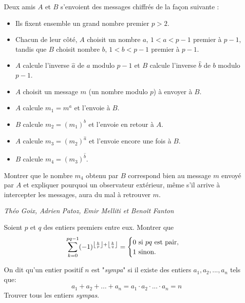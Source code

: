 \begin{exo}{}
Deux amis $A$ et $B$ s'envoient des messages chiffr\'es de la fa\c con suivante :
{\small
\begin{itemize}
\item Ils fixent ensemble un grand nombre premier $p>2$.
\item Chacun de leur c\^ot\'e, $A$ choisit un nombre $a$, $1 < a < p-1$ premier \`a $p-1$, tandis que $B$ choisit nombre $b$, $1<b<p-1$ premier \`a $p-1$.
\item $A$ calcule l'inverse $\widehat{a}$ de $a$ modulo $p-1$ et $B$ calcule l'inverse $\widehat{b}$ de $b$ modulo $p-1$.
\item $A$ choisit un message $m$ (un nombre modulo $p$) \`a envoyer \`a $B$.
\item $A$ calcule $m_1=m^{a}$ et l'envoie \`a $B$.
\item $B$ calcule $m_2=(m_1)^{b}$ et l'envoie en retour \`a $A$.
\item $A$ calcule $m_3=(m_2)^{\widehat{a}}$ et l'envoie encore une fois \`a $B$.
\item $B$ calcule $m_4=(m_3)^{\widehat{b}}$.
\end{itemize}}
Montrer que le nombre $m_4$ obtenu par $B$ correspond bien au message $m$ envoy\'e par $A$ et expliquer pourquoi un observateur ext\'erieur, m\^eme s'il arrive \`a intercepter les messages, aura du mal \`a retrouver $m$.

\medskip
\textit{Théo Goix, Adrien Patoz, Emir Melliti et Benoît Fanton }
\end{exo}


\begin{exo}{}
Soient $p$ et $q$ des entiers premiers entre eux. Montrer que
\[\displaystyle{ \sum_{k=0}^{pq-1} (-1)^{\left\lfloor \frac{k}{p}\right\rfloor + \left\lfloor \frac{k}{q}\right\rfloor} = \begin{cases} 0 \textnormal{ si } pq \textnormal{ est pair,}\\ 1 \textnormal{ sinon.}\end{cases}}\]
\end{exo}


\begin{exo}{}
On dit qu'un entier positif $n$ est "\textit{sympa}" si il existe des entiers $a_1,a_2,...,a_n$ tels que:
$$a_1+a_2+...+a_n=a_1\cdot a_2 \cdot ...\cdot  a_n=n$$
Trouver tous les entiers \textit{sympas}.

\end{exo}


